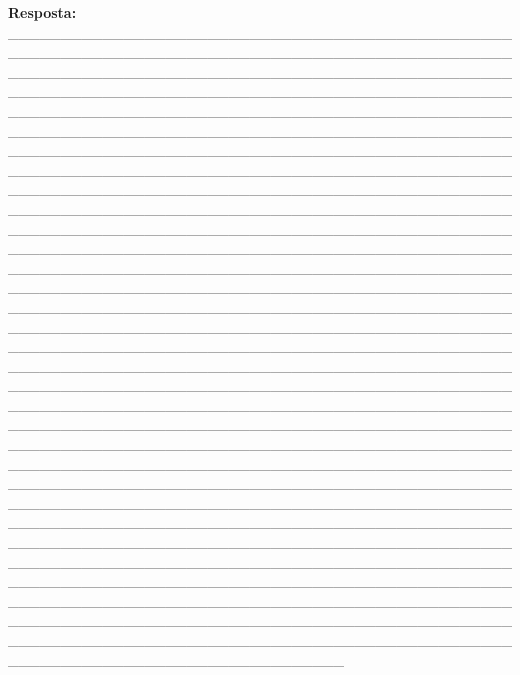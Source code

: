 \documentclass[
]{book}
\begin{document}
\textbf{Resposta:} \_\_\_\_\_\_\_\_\_\_\_\_\_\_\_\_\_\_\_\_\_\_\_\_\_\_\_\_\_\_\_\_\_\_\_\_\_\_\_\_\_\_\_\_\_\_\_\_\_\_\_\_\_\_\_\_\_\_\_\_\_\_\_\_\_\_\_\_\_\_\_\_\_\_\_\_\_\_\_\_\_\_\_\_\_\_\_\_\_\_\_\_\_\_\_\_\_\_\_\_\_\_\_\_\_\_\_\_\_\_\_\_\_\_\_\_\_\_\_\_\_\_\_\_\_\_\_\_\_\_\_\_\_\_\_\_\_\_\_\_\_\_\_\_\_\_\_\_\_\_\_\_\_\_\_\_\_\_\_\_\_\_\_\_\_\_\_\_\_\_\_\_\_\_\_\_\_\_\_\_\_\_\_\_\_\_\_\_\_\_\_\_\_\_\_\_\_\_\_\_\_\_\_\_\_\_\_\_\_\_\_\_\_\_\_\_\_\_\_\_\_\_\_\_\_\_\_\_\_\_\_\_\_\_\_\_\_\_\_\_\_\_\_\_\_\_\_\_\_\_\_\_\_\_\_\_\_\_\_\_\_\_\_\_\_\_\_\_\_\_\_\_\_\_\_\_\_\_\_\_\_\_\_\_\_\_\_\_\_\_\_\_\_\_\_\_\_\_\_\_\_\_\_\_\_\_\_\_\_\_\_\_\_\_\_\_\_\_\_\_\_\_\_\_\_\_\_\_\_\_\_\_\_\_\_\_\_\_\_\_\_\_\_\_\_\_\_\_\_\_\_\_\_\_\_\_\_\_\_\_\_\_\_\_\_\_\_\_\_\_\_\_\_\_\_\_\_\_\_\_\_\_\_\_\_\_\_\_\_\_\_\_\_\_\_\_\_\_\_\_\_\_\_\_\_\_\_\_\_\_\_\_\_\_\_\_\_\_\_\_\_\_\_\_\_\_\_\_\_\_\_\_\_\_\_\_\_\_\_\_\_\_\_\_\_\_\_\_\_\_\_\_\_\_\_\_\_\_\_\_\_\_\_\_\_\_\_\_\_\_\_\_\_\_\_\_\_\_\_\_\_\_\_\_\_\_\_\_\_\_\_\_\_\_\_\_\_\_\_\_\_\_\_\_\_\_\_\_\_\_\_\_\_\_\_\_\_\_\_\_\_\_\_\_\_\_\_\_\_\_\_\_\_\_\_\_\_\_\_\_\_\_\_\_\_\_\_\_\_\_\_\_\_\_\_\_\_\_\_\_\_\_\_\_\_\_\_\_\_\_\_\_\_\_\_\_\_\_\_\_\_\_\_\_\_\_\_\_\_\_\_\_\_\_\_\_\_\_\_\_\_\_\_\_\_\_\_\_\_\_\_\_\_\_\_\_\_\_\_\_\_\_\_\_\_\_\_\_\_\_\_\_\_\_\_\_\_\_\_\_\_\_\_\_\_\_\_\_\_\_\_\_\_\_\_\_\_\_\_\_\_\_\_\_\_\_\_\_\_\_\_\_\_\_\_\_\_\_\_\_\_\_\_\_\_\_\_\_\_\_\_\_\_\_\_\_\_\_\_\_\_\_\_\_\_\_\_\_\_\_\_\_\_\_\_\_\_\_\_\_\_\_\_\_\_\_\_\_\_\_\_\_\_\_\_\_\_\_\_\_\_\_\_\_\_\_\_\_\_\_\_\_\_\_\_\_\_\_\_\_\_\_\_\_\_\_\_\_\_\_\_\_\_\_\_\_\_\_\_\_\_\_\_\_\_\_\_\_\_\_\_\_\_\_\_\_\_\_\_\_\_\_\_\_\_\_\_\_\_\_\_\_\_\_\_\_\_\_\_\_\_\_\_\_\_\_\_\_\_\_\_\_\_\_\_\_\_\_\_\_\_\_\_\_\_\_\_\_\_\_\_\_\_\_\_\_\_\_\_\_\_\_\_\_\_\_\_\_\_\_\_\_\_\_\_\_\_\_\_\_\_\_\_\_\_\_\_\_\_\_\_\_\_\_\_\_\_\_\_\_\_\_\_\_\_\_\_\_\_\_\_\_\_\_\_\_\_\_\_\_\_\_\_\_\_\_\_\_\_\_\_\_\_\_\_\_\_\_\_\_\_\_\_\_\_\_\_\_\_\_\_\_\_\_\_\_\_\_\_\_\_\_\_\_\_\_\_\_\_\_\_\_\_\_\_\_\_\_\_\_\_\_\_\_\_\_\_\_\_\_\_\_\_\_\_\_\_\_\_\_\_\_\_\_\_\_\_\_\_\_\_\_\_\_\_\_\_\_\_\_\_\_\_\_\_\_\_\_\_\_\_\_\_\_\_\_\_\_\_\_\_\_\_\_\_\_\_\_\_\_\_\_\_\_\_\_\_\_\_\_\_\_\_\_\_\_\_\_\_\_\_\_\_\_\_\_\_\_\_\_\_\_\_\_\_\_\_\_\_\_\_\_\_\_\_\_\_\_\_\_\_\_\_\_\_\_\_\_\_\_\_\_\_\_\_\_\_\_\_\_\_\_\_\_\_\_\_\_\_\_\_\_\_\_\_\_\_\_\_\_\_\_\_\_\_\_\_\_\_\_\_\_\_\_\_\_\_\_\_\_\_\_\_\_\_\_\_\_\_\_\_\_\_\_\_\_\_\_\_\_\_\_\_\_\_\_\_\_\_\_\_\_\_\_\_\_\_\_\_\_\_\_\_\_\_\_\_\_\_\_\_\_\_\_\_\_\_\_\_\_\_\_\_\_\_\_\_\_\_\_\_\_\_\_\_\_\_\_\_\_\_\_\_\_\_\_\_\_\_\_\_\_\_\_\_\_\_\_\_\_\_\_\_\_\_\_\_\_\_\_\_\_\_\_\_\_\_\_\_\_\_\_\_\_\_\_\_\_\_\_\_\_\_\_\_\_\_\_\_\_\_\_\_\_\_\_\_\_\_\_\_\_\_\_\_\_\_\_\_\_\_\_\_\_\_\_\_\_\_\_\_\_\_\_\_\_\_\_\_\_\_\_\_\_\_\_\_\_\_\_\_\_\_\_\_\_\_\_\_\_\_\_\_\_\_\_\_\_\_\_\_\_\_\_\_\_\_\_\_\_\_\_\_\_\_\_\_\_\_\_\_\_\_\_\_\_\_\_\_\_\_\_\_\_\_\_\_\_\_\_\_\_\_\_\_\_\_\_\_\_\_\_\_\_\_\_\_\_\_\_\_\_\_\_\_\_\_\_\_\_\_\_\_\_\_\_\_\_\_\_\_\_\_\_\_\_\_\_\_\_\_\_\_\_\_\_\_\_\_\_\_\_\_\_\_\_\_\_\_\_\_\_\_\_\_\_\_\_\_\_\_\_\_\_\_\_\_\_\_\_\_\_\_\_\_\_\_\_\_\_\_\_\_\_\_\_\_\_\_\_\_\_\_\_\_\_\_\_\_\_\_\_\_\_\_\_\_\_\_\_\_\_\_\_\_\_\_\_\_\_\_\_\_\_\_\_\_\_\_\_\_\_\_\_\_\_\_\_
\end{document}
